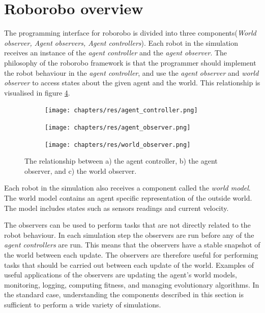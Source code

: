 \section{Roborobo overview}
\label{sec:roborobo_overview}
The programming interface for roborobo is divided into three components(\emph{World observer, Agent observers, Agent controllers})\cite{bredeche_roborobo!_2013}.
Each robot in the simulation receives an instance of the \emph{agent controller} and the \emph{agent observer}.
The philosophy of the roborobo framework is that the programmer should implement the robot behaviour in the \emph{agent controller}, and use the \emph{agent observer} and \emph{world observer} to access states about the given agent and the world.
This relationship is visualised in figure \ref{fig:component-relationship}.

\begin{figure}[H]
	\centering
	\begin{subfigure}{0.31\textwidth}
		\label{fig:controller}
		\centering
		\hspace*{1.15cm}\texttt{[image: chapters/res/agent\_controller.png]}
		\caption{}
	\end{subfigure}
	\begin{subfigure}{0.31\textwidth}
		\label{fig:agent-observer}
		\centering
		\texttt{[image: chapters/res/agent\_observer.png]}
		\caption{}
	\end{subfigure}
	\begin{subfigure}{0.31\textwidth}
		\label{fig:world-observer}
		\centering
		\texttt{[image: chapters/res/world\_observer.png]}
		\caption{}
	\end{subfigure}
	\caption{The relationship between a) the agent controller, b) the agent observer, and c) the world observer. }
	\label{fig:component-relationship}
\end{figure}

Each robot in the simulation also receives a component called the \emph{world model}.
The world model contains an agent specific representation of the outside world.
The model includes states such as sensors readings and current velocity.

The observers can be used to perform tasks that are not directly related to the robot behaviour.
In each simulation step the observers are run before any of the \emph{agent controllers} are run.
This means that the observers have a stable snapshot of the world between each update.
The observers are therefore useful for performing tasks that should be carried out between each update of the world.
Examples of useful applications of the observers are updating the agent's world models, monitoring, logging, computing fitness, and managing evolutionary algorithms.
In the standard case, understanding the components described in this section is sufficient to perform a wide variety of simulations.

